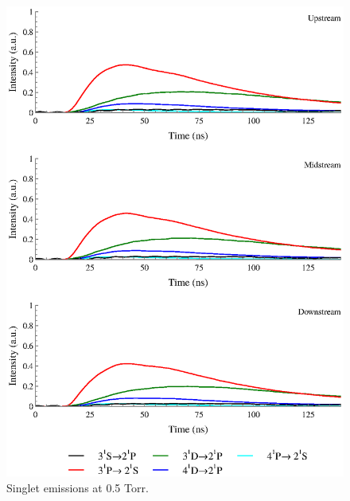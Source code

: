 \begin{figure}
  \centering
  \includegraphics{./chapters/extraem/figures/05torr_s.eps}
  \caption{Singlet emissions at 0.5 Torr.}
\end{figure}
